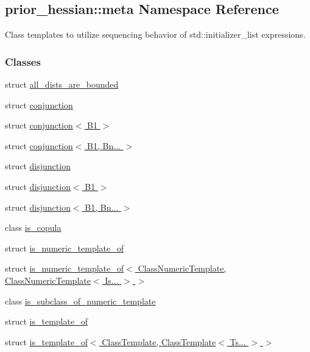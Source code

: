 \hypertarget{namespaceprior__hessian_1_1meta}{}\subsection{prior\+\_\+hessian\+:\+:meta Namespace Reference}
\label{namespaceprior__hessian_1_1meta}


Class templates to utilize sequencing behavior of std\+::initializer\+\_\+list expressions.  


\subsubsection*{Classes}
\begin{DoxyCompactItemize}
\item 
struct \hyperlink{structprior__hessian_1_1meta_1_1all__dists__are__bounded}{all\+\_\+dists\+\_\+are\+\_\+bounded}
\item 
struct \hyperlink{structprior__hessian_1_1meta_1_1conjunction}{conjunction}
\item 
struct \hyperlink{structprior__hessian_1_1meta_1_1conjunction_3_01B1_01_4}{conjunction$<$ B1 $>$}
\item 
struct \hyperlink{structprior__hessian_1_1meta_1_1conjunction_3_01B1_00_01Bn_8_8_8_01_4}{conjunction$<$ B1, Bn... $>$}
\item 
struct \hyperlink{structprior__hessian_1_1meta_1_1disjunction}{disjunction}
\item 
struct \hyperlink{structprior__hessian_1_1meta_1_1disjunction_3_01B1_01_4}{disjunction$<$ B1 $>$}
\item 
struct \hyperlink{structprior__hessian_1_1meta_1_1disjunction_3_01B1_00_01Bn_8_8_8_01_4}{disjunction$<$ B1, Bn... $>$}
\item 
class \hyperlink{classprior__hessian_1_1meta_1_1is__copula}{is\+\_\+copula}
\item 
struct \hyperlink{structprior__hessian_1_1meta_1_1is__numeric__template__of}{is\+\_\+numeric\+\_\+template\+\_\+of}
\item 
struct \hyperlink{structprior__hessian_1_1meta_1_1is__numeric__template__of_3_01ClassNumericTemplate_00_01ClassNum9ff24e61e3d3187d075a4a72dee66cb3}{is\+\_\+numeric\+\_\+template\+\_\+of$<$ Class\+Numeric\+Template, Class\+Numeric\+Template$<$ Is... $>$ $>$}
\item 
class \hyperlink{classprior__hessian_1_1meta_1_1is__subclass__of__numeric__template}{is\+\_\+subclass\+\_\+of\+\_\+numeric\+\_\+template}
\item 
struct \hyperlink{structprior__hessian_1_1meta_1_1is__template__of}{is\+\_\+template\+\_\+of}
\item 
struct \hyperlink{structprior__hessian_1_1meta_1_1is__template__of_3_01ClassTemplate_00_01ClassTemplate_3_01Ts_8_8_8_01_4_01_4}{is\+\_\+template\+\_\+of$<$ Class\+Template, Class\+Template$<$ Ts... $>$ $>$}
\end{DoxyCompactItemize}
